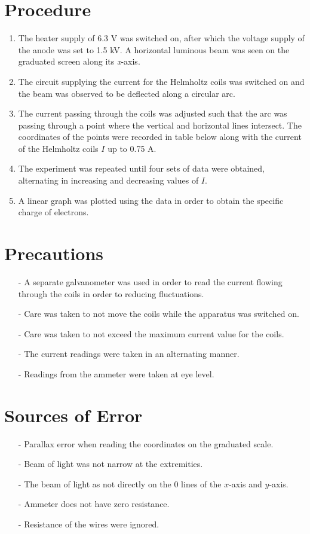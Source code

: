 \documentclass[12pt, a4paper]{article}
\begin{document}
\section*{Procedure}
\begin{enumerate}
    \item The heater supply of 6.3 V was switched on, after which the voltage supply of the anode was set to 1.5 kV. A horizontal luminous beam was seen on the graduated screen along its \textit{x}-axis.
    \item The circuit supplying the current for the Helmholtz coils was switched on and the beam was observed to be deflected along a circular arc.
    \item The current passing through the coils was adjusted such that the arc was passing through a point where the vertical and horizontal lines intersect. The coordinates of the points were recorded in table below along with the current of the Helmholtz coils $I$ up to 0.75 A.
    \item The experiment was repeated until four sets of data were obtained, alternating in increasing and decreasing values of $I$.
    \item A linear graph was plotted using the data in order to obtain the specific charge of electrons.
\end{enumerate}

\section*{Precautions}
\begin{itemize}
    \item[-] A separate galvanometer was used in order to read the current flowing through the coils in order to reducing fluctuations.
    \item[-] Care was taken to  not move the coils while the apparatus was switched on.
    \item[-] Care was taken to not exceed the maximum current value for the coils.
    \item[-] The current readings were taken in an alternating manner.
    \item[-] Readings from the ammeter were taken at eye level.
\end{itemize}

\section*{Sources of Error}
\begin{itemize}
    \item[-] Parallax error when reading the coordinates on the graduated scale.
    \item[-] Beam of light was not narrow at the extremities.
    \item[-] The beam of light as not directly on the 0 lines of the $x$-axis and $y$-axis.
    \item[-] Ammeter does not have zero resistance.
    \item[-] Resistance of the wires were ignored. 
\end{itemize}
\end{document}
